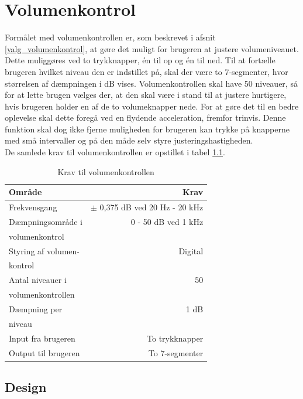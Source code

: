 \chapter{Volumenkontrol}
\label{volumenkontrol}
Formålet med volumenkontrollen er, som beskrevet i afsnit \ref{valg_volumenkontrol}, at gøre det muligt for brugeren at justere volumeniveauet. Dette muliggøres ved to trykknapper, én til op og én til ned. Til at fortælle brugeren hvilket niveau den er indstillet på, skal der være to 7-segmenter, hvor størrelsen af dæmpningen i dB vises. Volumenkontrollen skal have 50 niveauer, så for at lette brugen vælges der, at den skal være i stand til at justere hurtigere, hvis brugeren holder en af de to volumeknapper nede. For at gøre det til en bedre oplevelse skal dette foregå ved en flydende acceleration, fremfor trinvis. Denne funktion skal dog ikke fjerne muligheden for brugeren kan trykke på knapperne med små intervaller og på den måde selv styre justeringshastigheden. \\
De samlede krav til volumenkontrollen er opstillet i tabel \ref{tab:krav_volumenkontrol}.

\begin{table}[h]
\centering
\begin{tabular}{l|r}
\hline\hline
Område & Krav \\
\hline\hline
Frekvensgang & $\pm$ 0,375 dB ved 20 Hz - 20 kHz \\[4pt]
Dæmpningsområde i & 0 - 50 dB ved 1 kHz \\
volumenkontrol & \\[4pt]
Styring af volumen- & Digital \\
kontrol & \\[4pt]
Antal niveauer i & 50 \\
volumenkontrollen & \\[4pt]
Dæmpning per & 1 dB \\
niveau & \\[4pt]
Input fra brugeren & To trykknapper \\[4pt]
Output til brugeren & To 7-segmenter \\
\hline\hline
\end{tabular}
\caption{Krav til volumenkontrollen}
\label{tab:krav_volumenkontrol}
\end{table}

\clearpage
\section{Design}
\label{volumenkontrol-design}

